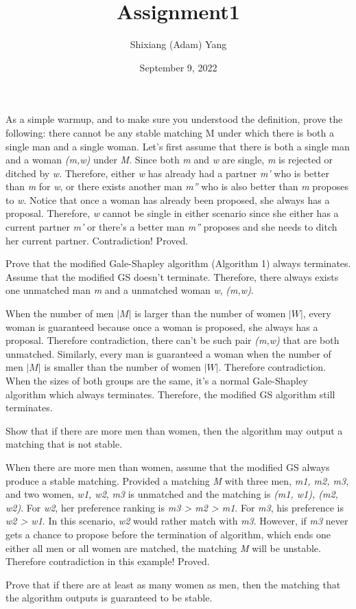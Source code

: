 \documentclass{homework}
\author{Shixiang (Adam) Yang}
\date{September 9, 2022}
\title{Assignment1}
\begin{document}
 \maketitle

\question  As a simple warmup, and to make sure you understood the definition, prove the following: there cannot be any stable matching M under which there is both a single man and a single woman.
Let's first assume that there is both a single man and a woman \textit{(m,w)} under \textit{M}. Since both \textit{m} and \textit{w} are single, \textit{m} is rejected or ditched by \textit{w}. Therefore, either \textit{w} has already had a partner \textit{m'} who is better than \textit{m} for \textit{w}, or there exists another man \textit{m''} who is also better than \textit{m} proposes to \textit{w}. Notice that once a woman has already been proposed, she always has a proposal. Therefore, \textit{w} cannot be single in either scenario since she either has a current partner \textit{m'} or there's a better man \textit{m''} proposes and she needs to ditch her current partner. Contradiction! Proved.


\question  Prove that the modified Gale-Shapley algorithm (Algorithm 1) always terminates.
Assume that the modified GS doesn't terminate. Therefore, there always exists one unmatched man \textit{m} and a unmatched woman \textit{w}, \textit{(m,w)}.

When the number of men \textit{$|M|$} is larger than the number of women \textit{$|W|$}, every woman is guaranteed because once a woman is proposed, she always has a proposal. Therefore contradiction, there can't be such pair \textit{(m,w)} that are both unmatched. Similarly, every man is guaranteed a woman when the number of men \textit{$|M|$} is smaller than the number of women \textit{$|W|$}. Therefore contradiction. When the sizes of both groups are the same, it's a normal Gale-Shapley algorithm which always terminates. Therefore, the modified GS algorithm still terminates.



\question Show that if there are more men than women, then the algorithm may output a matching that is not stable.

When there are more men than women, assume that the modified GS always produce a stable matching. Provided a matching \textit{M} with three men, \textit{m1, m2, m3}, and two women, \textit{w1, w2}, \textit{m3} is unmatched and the matching is \textit{(m1, w1), (m2, w2)}. For \textit{w2}, her preference ranking is \textit{m3 > m2 > m1}. For \textit{m3}, his preference is \textit{w2 > w1}. In this scenario, \textit{w2} would rather match with \textit{m3}. However, if \textit{m3} never gets a chance to propose before the termination of algorithm, which ends one either all men or all women are matched, the matching \textit{M} will be unstable.
Therefore contradiction in this example! Proved.

\question Prove that if there are at least as many women as men, then the matching that the algorithm outputs is guaranteed to be stable.
\end{document}
